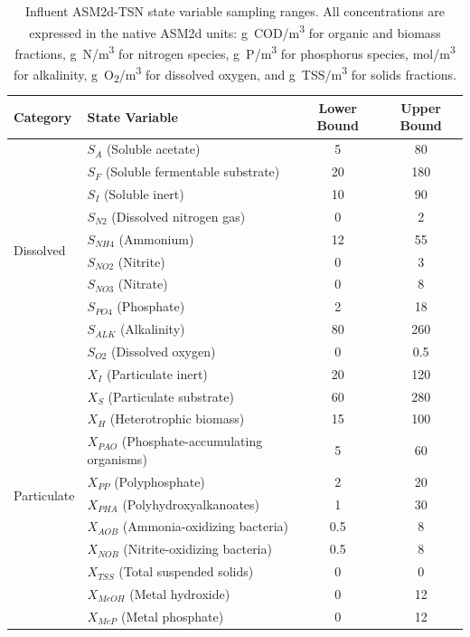 \documentclass[11pt]{article}
\begin{document}
\begin{table}[htbp]
\centering
\caption{Influent ASM2d-TSN state variable sampling ranges. All concentrations are expressed in the native ASM2d units: g~COD/m\textsuperscript{3} for organic and biomass fractions, g~N/m\textsuperscript{3} for nitrogen species, g~P/m\textsuperscript{3} for phosphorus species, mol/m\textsuperscript{3} for alkalinity, g~O\textsubscript{2}/m\textsuperscript{3} for dissolved oxygen, and g~TSS/m\textsuperscript{3} for solids fractions.}
\label{tab:influent_ranges}
\begin{tabular}{@{}llcc@{}}
\toprule
\textbf{Category} & \textbf{State Variable} & \textbf{Lower Bound} & \textbf{Upper Bound} \\
\midrule
\multirow{10}{*}{Dissolved}
 & $S_A$ (Soluble acetate) & 5 & 80 \\
 & $S_F$ (Soluble fermentable substrate) & 20 & 180 \\
 & $S_I$ (Soluble inert) & 10 & 90 \\
 & $S_{N2}$ (Dissolved nitrogen gas) & 0 & 2 \\
 & $S_{NH4}$ (Ammonium) & 12 & 55 \\
 & $S_{NO2}$ (Nitrite) & 0 & 3 \\
 & $S_{NO3}$ (Nitrate) & 0 & 8 \\
 & $S_{PO4}$ (Phosphate) & 2 & 18 \\
 & $S_{ALK}$ (Alkalinity) & 80 & 260 \\
 & $S_{O2}$ (Dissolved oxygen) & 0 & 0.5 \\
\midrule
\multirow{11}{*}{Particulate}
 & $X_I$ (Particulate inert) & 20 & 120 \\
 & $X_S$ (Particulate substrate) & 60 & 280 \\
 & $X_H$ (Heterotrophic biomass) & 15 & 100 \\
 & $X_{PAO}$ (Phosphate-accumulating organisms) & 5 & 60 \\
 & $X_{PP}$ (Polyphosphate) & 2 & 20 \\
 & $X_{PHA}$ (Polyhydroxyalkanoates) & 1 & 30 \\
 & $X_{AOB}$ (Ammonia-oxidizing bacteria) & 0.5 & 8 \\
 & $X_{NOB}$ (Nitrite-oxidizing bacteria) & 0.5 & 8 \\
 & $X_{TSS}$ (Total suspended solids) & 0 & 0 \\
 & $X_{MeOH}$ (Metal hydroxide) & 0 & 12 \\
 & $X_{MeP}$ (Metal phosphate) & 0 & 12 \\
\bottomrule
\end{tabular}
\end{table}
\end{document}
